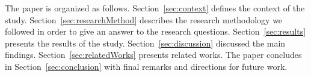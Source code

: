 The paper is organized as follows. Section~\ref{sec:context} defines the context of the study. Section~\ref{sec:researchMethod} describes the research methodology we followed in order to give an answer to the research questions. Section~\ref{sec:results} presents the results of the study. Section~\ref{sec:discussion} discussed the main findings. Section~\ref{sec:relatedWorks} presents related works. The paper concludes in Section~\ref{sec:conclusion} with final remarks and directions for future work.

